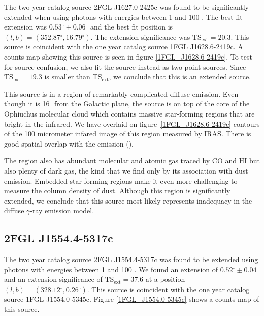 \documentclass[12pt,preprint]{aastex}
\newcommand{\gev}{\text{GeV}\xspace}
\newcommand{\tsext}{{\ensuremath{\text{TS}_\text{ext}}}\xspace}
\newcommand{\tsinc}{\ensuremath{\text{TS}_\text{inc}}\xspace}
\renewcommand{\deg}{\ensuremath{^\circ}\xspace}
\begin{document}

The two year catalog source 2FGL J1627.0-2425c was found to be
significantly extended when using photons with energies between 1 \gev
and 100 \gev.  The best fit extension was $0.53\deg\pm0.06\deg$ and the
best fit position is $(l,b)=(352.87\deg, 16.79\deg)$.
The extension significance was $\tsext=20.3$. 
This source is coincident with the one year catalog source 1FGL J1628.6-2419c.
A counts map showing this source is
seen in figure \ref{1FGL_J1628.6-2419c}.  To test for source confusion,
we also fit the source instead as two point sources. Since $\tsinc=19.3$
is smaller than \tsext, we conclude that this is an extended source.

This source is in a region of remarkably complicated diffuse emission.
Even though it is 16\deg from the Galactic plane, the source is on top
of the core of the Ophiuchus molecular cloud which contains massive
star-forming regions that are bright in the infrared.  We have overlaid
on figure~\ref{1FGL_J1628.6-2419c} contours of the 100 micrometer infared
image of this region measured by IRAS. There is good spatial overlap
with the \gev emission (\cite{iras_rho_ophiuci}).

The region also has abundant molecular and atomic gas traced by CO
and HI but also plenty of dark gas, the kind that we find only by its
association with dust emission. Embedded star-forming regions make it even
more challenging to measure the column density of dust.  Although this
region is significantly extended, we conclude that this source most
likely represents inadequacy in the diffuse $\gamma$-ray emission model.


\subsection{2FGL J1554.4-5317c}
\label{section_2FGL_J1554.4-5317c}


The two year catalog source 2FGL J1554.4-5317c was found to be extended
using photons with energies between 1 \gev and 100 \gev.  We found an
extension of $0.52\deg\pm 0.04\deg$ and an extension significance of
$\tsext=37.6$ at a position $(l,b)=(328.12\deg,0.26\deg)$.  
This source is coincident with the one year catalog source 1FGL J1554.0-5345c.
Figure \ref{1FGL_J1554.0-5345c} shows a counts map of this source.
\end{document}
